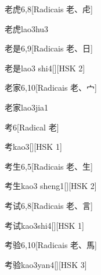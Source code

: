 \begin{entry}{老虎}{6,8}[Radicais ⽼、⾌]
  \begin{phonetics}{老虎}{lao3hu3}
  \end{phonetics}
\end{entry}

\begin{entry}{老是}{6,9}[Radicais ⽼、⽇]
  \begin{phonetics}{老是}{lao3 shi4}[][HSK 2]
  \end{phonetics}
\end{entry}

\begin{entry}{老家}{6,10}[Radicais ⽼、⼧]
  \begin{phonetics}{老家}{lao3jia1}
  \end{phonetics}
\end{entry}

\begin{entry}{考}{6}[Radical ⽼]
  \begin{phonetics}{考}{kao3}[][HSK 1]
  \end{phonetics}
\end{entry}

\begin{entry}{考生}{6,5}[Radicais ⽼、⽣]
  \begin{phonetics}{考生}{kao3 sheng1}[][HSK 2]
  \end{phonetics}
\end{entry}

\begin{entry}{考试}{6,8}[Radicais ⽼、⾔]
  \begin{phonetics}{考试}{kao3shi4}[][HSK 1]
  \end{phonetics}
\end{entry}

\begin{entry}{考验}{6,10}[Radicais ⽼、⾺]
  \begin{phonetics}{考验}{kao3yan4}[][HSK 3]
  \end{phonetics}
\end{entry}

